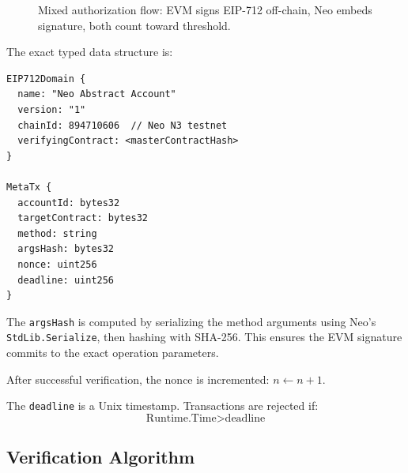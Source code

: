 \documentclass[10pt,twocolumn]{article}
\newcommand{\code}[1]{\texttt{\small #1}}
\begin{document}
{\begin{figure}[t]
\begin{tikzpicture}
\end{tikzpicture}
\caption{Mixed authorization flow: EVM signs EIP-712 off-chain, Neo embeds signature, both count toward threshold.}
\label{fig:mixed-flow-detailed}
\end{figure}

The exact typed data structure is:

\begin{verbatim}
EIP712Domain {
  name: "Neo Abstract Account"
  version: "1"
  chainId: 894710606  // Neo N3 testnet
  verifyingContract: <masterContractHash>
}

MetaTx {
  accountId: bytes32
  targetContract: bytes32
  method: string
  argsHash: bytes32
  nonce: uint256
  deadline: uint256
}
\end{verbatim}

The \code{argsHash} is computed by serializing the method arguments using Neo's \code{StdLib.Serialize}, then hashing with SHA-256. This ensures the EVM signature commits to the exact operation parameters.

After successful verification, the nonce is incremented: $n \gets n + 1$.


The \code{deadline} is a Unix timestamp. Transactions are rejected if:
$$\text{Runtime.Time} > \text{deadline}$$

\subsection{Verification Algorithm}
\begin{figure}[t]
\centering
\small
{}
\end{figure}}
\end{document}
